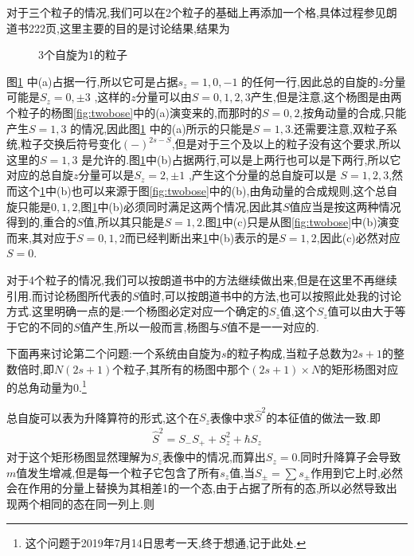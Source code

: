 对于三个粒子的情况,我们可以在2个粒子的基础上再添加一个格,具体过程参见朗道书222页,这里主要的目的是讨论结果,结果为

\begin{figure}[H]
  \centering
  \caption{3个自旋为1的粒子}
  \label{fig:threebose}
\end{figure}

图\ref{fig:threebose} 中(a)占据一行,所以它可是占据$s_z=1,0,-1$ 的任何一行,因此总的自旋的$z$分量可能是$S_z=0,\pm 3$ ,这样的$z$分量可以由$S=0,1,2,3$产生,但是注意,这个杨图是由两个粒子的杨图\ref{fig:twobose}中的(a)演变来的,而那时的$S=0,2$,按角动量的合成,只能产生$S=1,3$ 的情况,因此图\ref{fig:threebose} 中的(a)所示的只能是$S=1,3$.还需要注意,双粒子系统,粒子交换后符号变化$(-)^{2s-S}$,但是对于三个及以上的粒子没有这个要求,所以这里的$S=1,3$ 是允许的.图\ref{fig:threebose}中(b)占据两行,可以是上两行也可以是下两行,所以它对应的总自旋$z$分量可以是$S_z=2,\pm 1$ ,产生这个分量的总自旋可以是 $S=1,2,3$,然而这个\ref{fig:threebose}中(b)也可以来源于图\ref{fig:twobose}中的(b),由角动量的合成规则,这个总自旋只能是$0,1,2$,图\ref{fig:threebose}中(b)必须同时满足这两个情况,因此其$S$值应当是按这两种情况得到的,重合的$S$值,所以其只能是$S=1,2$.图\ref{fig:threebose}中(c)只是从图\ref{fig:twobose}中(b)演变而来,其对应于$S=0,1,2$而已经判断出来\ref{fig:threebose}中(b)表示的是$S=1,2$,因此(c)必然对应$S=0$.

对于4个粒子的情况,我们可以按朗道书中的方法继续做出来,但是在这里不再继续引用.而讨论杨图所代表的$S$值时,可以按朗道书中的方法,也可以按照此处我的讨论方式.这里明确一点的是:一个杨图必定对应一个确定的$S_z$值,这个$S_z$值可以由大于等于它的不同的$S$值产生,所以一般而言,杨图与$S$值不是一一对应的.

下面再来讨论第二个问题:一个系统由自旋为$s$的粒子构成,当粒子总数为$2s+1$的整数倍时,即$N(2s+1)$个粒子,其所有的杨图中那个$(2s+1)\times N$的矩形杨图对应的总角动量为$0$.\footnote{这个问题于2019年7月14日思考一天,终于想通,记于此处.}

总自旋可以表为升降算符的形式,这个在$S_z$表像中求$\hat{S}^2$的本征值的做法一致.即
\begin{gather}
  \hat{S}^2=S_-S_++S_z^2+\hbar S_z
\end{gather}
对于这个矩形杨图显然理解为$S_z$表像中的情况,而算出$S_z=0$.同时升降算子会导致$m$值发生增减,但是每一个粒子它包含了所有$s_z$值,当$S_\pm=\sum s_\pm$作用到它上时,必然会在作用的分量上替换为其相差1的一个态,由于占据了所有的态,所以必然导致出现两个相同的态在同一列上.则

